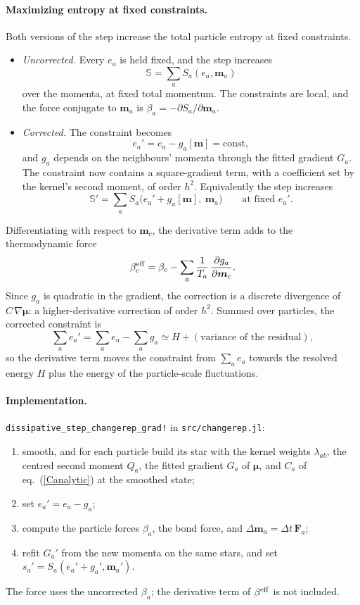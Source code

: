 \documentclass[11pt,aps,preprint,nofootinbib,superscriptaddress,tightenlines]{revtex4-2}
\def\st{\begin{equation}}
\def\stp{\end{equation}}
\def\Eq#1{eq.~(\ref{#1})}
\let\oldparagraph\paragraph
\renewcommand{\paragraph}{\par\bigskip\oldparagraph}
\begin{document}
\paragraph{Maximizing entropy at fixed constraints.}  Both versions of the step
increase the total particle entropy at fixed constraints.
\begin{itemize}
\item \emph{Uncorrected.}  Every $e_a$ is held fixed, and the step increases
  \st
  \mathbb S=\sum_aS_a(e_a,\bm m_a)
  \stp
  over the momenta, at fixed total momentum.  The constraints are local, and
  the force conjugate to $\bm m_a$ is $\beta_a=-\partial S_a/\partial\bm m_a$.
\item \emph{Corrected.}  The constraint becomes
  \st
  e_a'=e_a-g_a[\bm m]=\text{const},
  \stp
  and $g_a$ depends on the neighbours' momenta through the fitted gradient
  $G_a$.  The constraint now contains a square-gradient term, with a coefficient
  set by the kernel's second moment, of order $h^2$.  Equivalently the step
  increases
  \st
  \mathbb S'=\sum_aS_a\big(e_a'+g_a[\bm m],\ \bm m_a\big)\qquad\text{at fixed }e_a' .
  \stp
\end{itemize}
Differentiating with respect to $\bm m_c$, the derivative term adds to the
thermodynamic force
\st
\beta_c^{\rm eff}=\beta_c-\sum_a\frac1{T_a}\,\frac{\partial g_a}{\partial\bm m_c} .
\label{betaeff}
\stp
Since $g_a$ is quadratic in the gradient, the correction is a discrete
divergence of $C\,\nabla\bm\mu$: a higher-derivative correction of order $h^2$.
Summed over particles, the corrected constraint is
\st
\sum_ae_a'=\sum_ae_a-\sum_ag_a\simeq H+(\text{variance of the residual}),
\stp
so the derivative term moves the constraint from $\sum_ae_a$ towards the resolved
energy $H$ plus the energy of the particle-scale fluctuations.

\paragraph{Implementation.}  \texttt{dissipative\_step\_changerep\_grad!} in
\texttt{src/changerep.jl}:
\begin{enumerate}
\item smooth, and for each particle build its star with the kernel weights
  $\lambda_{ab}$, the centred second moment $Q_a$, the fitted gradient $G_a$ of
  $\bm\mu$, and $C_a$ of \Eq{Canalytic} at the smoothed state;
\item set $e_a'=e_a-g_a$;
\item compute the particle forces $\beta_a$, the bond force, and
  $\Delta\bm m_a=\Delta t\,\bm F_a$;
\item refit $G_a'$ from the new momenta on the same stars, and set
  $s_a'=S_a(e_a'+g_a',\bm m_a')$.
\end{enumerate}
The force uses the uncorrected $\beta_a$; the derivative term of $\beta^{\rm eff}$
is not included.
\end{document}
